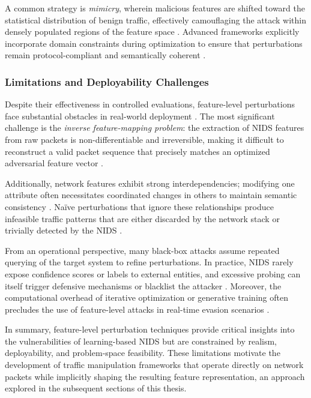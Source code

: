 A common strategy is \emph{mimicry}, wherein malicious features are shifted toward the statistical distribution of benign traffic, effectively camouflaging the attack within densely populated regions of the feature space \cite{li2020adversarial}. 
Advanced frameworks explicitly incorporate domain constraints during optimization to ensure that perturbations remain protocol-compliant and semantically coherent \cite{wang2024progen}.

\subsubsection{Limitations and Deployability Challenges}

Despite their effectiveness in controlled evaluations, feature-level perturbations face substantial obstacles in real-world deployment \cite{debicha2023adv}. 
The most significant challenge is the \emph{inverse feature-mapping problem}: the extraction of NIDS features from raw packets is non-differentiable and irreversible, making it difficult to reconstruct a valid packet sequence that precisely matches an optimized adversarial feature vector \cite{han2021evaluating}. 

Additionally, network features exhibit strong interdependencies; modifying one attribute often necessitates coordinated changes in others to maintain semantic consistency \cite{ennaji2025adversarial}. 
Naïve perturbations that ignore these relationships produce infeasible traffic patterns that are either discarded by the network stack or trivially detected by the NIDS \cite{vitorino2023sok}. 

From an operational perspective, many black-box attacks assume repeated querying of the target system to refine perturbations. 
In practice, NIDS rarely expose confidence scores or labels to external entities, and excessive probing can itself trigger defensive mechanisms or blacklist the attacker \cite{liu2025hard}. 
Moreover, the computational overhead of iterative optimization or generative training often precludes the use of feature-level attacks in real-time evasion scenarios \cite{alasad2026comprehensive}.

In summary, feature-level perturbation techniques provide critical insights into the vulnerabilities of learning-based NIDS but are constrained by realism, deployability, and problem-space feasibility. 
These limitations motivate the development of traffic manipulation frameworks that operate directly on network packets while implicitly shaping the resulting feature representation, an approach explored in the subsequent sections of this thesis.


